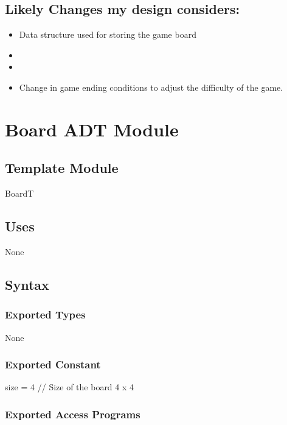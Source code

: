 \documentclass[12pt]{article}
\begin{document}
\newpage

\subsection*{Likely Changes my design considers:}

\begin{itemize}
  \item Data structure used for storing the game board
  \item  
  \item 
  \item Change in game ending conditions to adjust the difficulty of the game.
\end{itemize}

\newpage

\section* {Board ADT Module}

\subsection*{Template Module}

BoardT

\subsection* {Uses}

None

\subsection* {Syntax}

\subsubsection* {Exported Types}

None

\subsubsection* {Exported Constant}

size = 4 \quad // Size of the board 4 x 4

\subsubsection* {Exported Access Programs}
\end{document}
